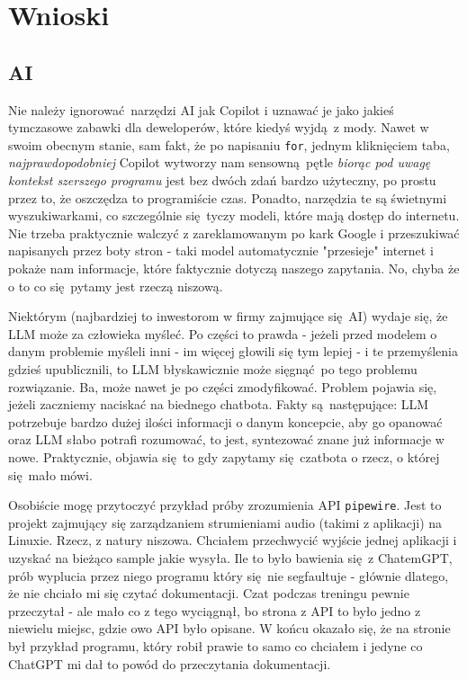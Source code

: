 	\newpage
\section{Wnioski}	%

\subsection{AI}
Nie należy ignorować narzędzi AI jak Copilot i uznawać je jako jakieś tymczasowe zabawki dla deweloperów, które kiedyś wyjdą z mody. Nawet w swoim obecnym stanie, sam fakt, że po napisaniu \texttt{for}, jednym kliknięciem taba, \textit{najprawdopodobniej} Copilot wytworzy nam sensowną pętle \textit{biorąc pod uwagę kontekst szerszego programu} jest bez dwóch zdań bardzo użyteczny, po prostu przez to, że oszczędza to programiście czas. Ponadto, narzędzia te są świetnymi wyszukiwarkami, co szczególnie się tyczy modeli, które mają dostęp do internetu. Nie trzeba praktycznie walczyć z zareklamowanym po kark Google i przeszukiwać napisanych przez boty stron - taki model automatycznie "przesieje" internet i pokaże nam informacje, które faktycznie dotyczą naszego zapytania. No, chyba że o to co się pytamy jest rzeczą niszową.

Niektórym (najbardziej to inwestorom w firmy zajmujące się AI) wydaje się, że LLM może za człowieka myśleć. Po części to prawda - jeżeli przed modelem o danym problemie myśleli inni - im więcej głowili się tym lepiej - i te przemyślenia gdzieś upublicznili, to LLM błyskawicznie może sięgnąć po tego problemu rozwiązanie. Ba, może nawet je po części zmodyfikować. Problem pojawia się, jeżeli zaczniemy naciskać na biednego chatbota. Fakty są następujące: LLM potrzebuje bardzo dużej ilości informacji o danym koncepcie, aby go opanować oraz LLM słabo potrafi rozumować, to jest, syntezować znane już informacje w nowe. Praktycznie, objawia się to gdy zapytamy się czatbota o rzecz, o której się mało mówi. 

Osobiście mogę przytoczyć przykład próby zrozumienia API \texttt{pipewire}\cite{pipewiresite}. Jest to projekt zajmujący się zarządzaniem strumieniami audio (takimi z aplikacji) na Linuxie. Rzecz, z natury niszowa. Chciałem przechwycić wyjście jednej aplikacji i uzyskać na bieżąco sample jakie wysyła. Ile to było bawienia się z ChatemGPT, prób wyplucia przez niego programu który się nie segfaultuje - głównie dlatego, że nie chciało mi się czytać dokumentacji. Czat podczas treningu pewnie przeczytał - ale mało co z tego wyciągnął, bo strona z API to było jedno z niewielu miejsc, gdzie owo API było opisane. W końcu okazało się, że na stronie był przykład programu, który robił prawie to samo co chciałem i jedyne co ChatGPT mi dał to powód do przeczytania dokumentacji. 

